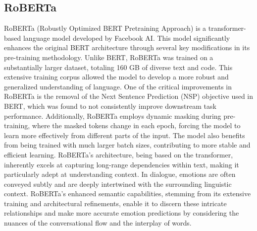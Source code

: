 \documentclass{article}
\begin{document}
\subsection{RoBERTa}
RoBERTa (Robustly Optimized BERT Pretraining Approach)  \cite{liu2019roberta}is a transformer-based language model developed by Facebook AI. This model significantly enhances the original BERT architecture through several key modifications in its pre-training methodology. Unlike BERT, RoBERTa was trained on a substantially larger dataset, totaling 160 GB of diverse text and code. This extensive training corpus allowed the model to develop a more robust and generalized understanding of language. One of the critical improvements in RoBERTa is the removal of the Next Sentence Prediction (NSP) objective used in BERT, which was found to not consistently improve downstream task performance. Additionally, RoBERTa employs dynamic masking during pre-training, where the masked tokens change in each epoch, forcing the model to learn more effectively from different parts of the input. The model also benefits from being trained with much larger batch sizes, contributing to more stable and efficient learning. RoBERTa's architecture, being based on the transformer, inherently excels at capturing long-range dependencies within text, making it particularly adept at understanding context. In dialogue, emotions are often conveyed subtly and are deeply intertwined with the surrounding linguistic context. RoBERTa's enhanced semantic capabilities, stemming from its extensive training and architectural refinements, enable it to discern these intricate relationships and make more accurate emotion predictions by considering the nuances of the conversational flow and the interplay of words.
\end{document}
